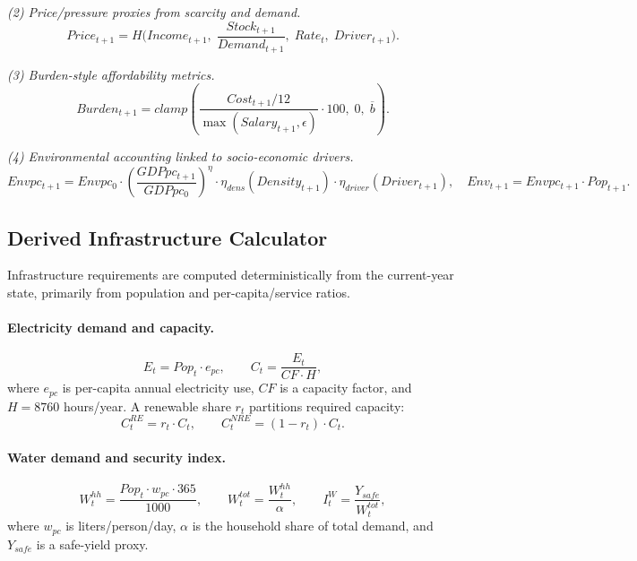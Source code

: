 \documentclass{article}
\begin{document}
\textit{(2) Price/pressure proxies from scarcity and demand.}
\begin{equation}
Price_{t+1} = H\Big(Income_{t+1},\; \frac{Stock_{t+1}}{Demand_{t+1}},\; Rate_t,\; Driver_{t+1}\Big).
\end{equation}

\textit{(3) Burden-style affordability metrics.}
\begin{equation}
Burden_{t+1}=clamp\left(\frac{Cost_{t+1}/12}{\max(Salary_{t+1},\epsilon)}\cdot 100,\; 0,\; \overline{b}\right).
\end{equation}

\textit{(4) Environmental accounting linked to socio-economic drivers.}
\begin{equation}
Envpc_{t+1}=Envpc_0 \cdot \left(\frac{GDPpc_{t+1}}{GDPpc_0}\right)^{\eta}
\cdot \eta_{dens}(Density_{t+1})\cdot \eta_{driver}(Driver_{t+1}),
\quad
Env_{t+1}=Envpc_{t+1}\cdot Pop_{t+1}.
\end{equation}

\subsection{Derived Infrastructure Calculator}
\label{subsec:infrastructure_calc}

Infrastructure requirements are computed deterministically from the current-year
state, primarily from population and per-capita/service ratios.

\paragraph{Electricity demand and capacity.}
\begin{equation}
E_t = Pop_t \cdot e_{pc}, \qquad C_t = \frac{E_t}{CF \cdot H},
\end{equation}
where $e_{pc}$ is per-capita annual electricity use, $CF$ is a capacity factor,
and $H=8760$ hours/year. A renewable share $r_t$ partitions required capacity:
\begin{equation}
C^{RE}_t = r_t \cdot C_t, \qquad C^{NRE}_t = (1-r_t)\cdot C_t.
\end{equation}

\paragraph{Water demand and security index.}
\begin{equation}
W^{hh}_t = \frac{Pop_t \cdot w_{pc} \cdot 365}{1000}, \qquad
W^{tot}_t = \frac{W^{hh}_t}{\alpha}, \qquad
I^W_t = \frac{Y_{safe}}{W^{tot}_t},
\end{equation}
where $w_{pc}$ is liters/person/day, $\alpha$ is the household share of total
demand, and $Y_{safe}$ is a safe-yield proxy.
\end{document}
